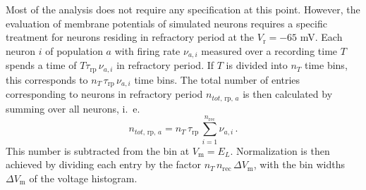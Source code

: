Most of the analysis does not require any specification at this point. 
However, the evaluation of membrane potentials of simulated neurons requires a specific treatment 
for neurons residing in refractory period at the $V_\text{r} = -65$ mV. 
Each neuron $i$ of population $a$ with firing rate $\nu_{a, i}$ measured over 
a recording time $T$ spends a time of \:$T \tau_\text{rp} \,\nu_{a, i}$\: in refractory 
period. If $T$ is divided into $n_T$ time bins, this corresponds to 
$n_T \, \tau_\text{rp} \,\nu_{a, i}$ time bins. The total number of entries 
corresponding to neurons in refractory period $n_{tot, \,\text{rp}, \,a}$ is then 
calculated by summing over all neurons, i.~e.
\begin{equation}
    n_{tot, \,\text{rp}, \,a}
        = n_T \, \tau_\text{rp} \,\sum_{i = 1}^{n_\text{rec}}\nu_{a, i} \, .
    \label{eq:n_tot_rp}
\end{equation}
This number is subtracted from the bin at $V_\text{m} = E_L$. Normalization is then
achieved by dividing each entry by the factor $n_T \, n_\text{rec} \, \Delta V_\text{m}$, 
with the bin widths $\Delta V_\text{m}$ of the voltage histogram.

